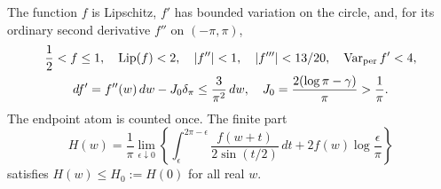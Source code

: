 \begin{lemma}\label{uc:scalar-maximum}
The function $f$ is Lipschitz, $f'$ has bounded variation on the circle,
and, for its ordinary second derivative $f''$ on $(-\pi,\pi)$,
\begin{equation}\label{uc:scalar-bounds}
 \begin{gathered}
 \frac12<f\leq1,\quad \operatorname{Lip}(f)<2,\quad
 |f''|<1,\quad |f'''|<13/20,\quad
 \operatorname{Var}_{\rm per}f'<4,\\
 df'=f''(w)\,dw-J_0\delta_\pi\leq\frac3{\pi^2}\,dw,
 \quad J_0=\frac{2(\log\pi-\gamma)}\pi>\frac1\pi.
 \end{gathered}
\end{equation}
The endpoint atom is counted once. The finite part
\begin{equation}\label{uc:H}
 H(w)=\frac1\pi\lim_{\epsilon\downarrow0}
 \left\{\int_\epsilon^{2\pi-\epsilon}
 \frac{f(w+t)}{2\sin(t/2)}\,dt+2f(w)\log\frac\epsilon\pi\right\}
\end{equation}
satisfies $H(w)\leq H_0:=H(0)$ for all real $w$.
\end{lemma}
